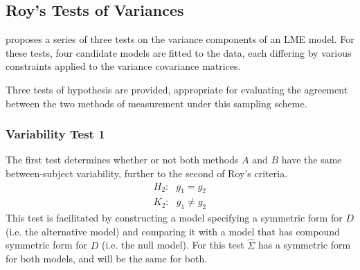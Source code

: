 \documentclass[12pt, a4paper]{report}
\theoremstyle{plain}
\theoremstyle{definition}
\theoremstyle{remark}
\begin{document}
	
	
	
	
	\subsection{Roy's Tests of Variances}
	
	
	
	
	\citet{ARoy2009} proposes a series of three tests on the variance components of an LME model. For these tests, four candidate models are fitted to the data, each differing by various constraints applied to the variance covariance matrices. 
	
	
	
	
	Three tests of hypothesis are provided, appropriate for evaluating the agreement between the two methods of measurement under this sampling scheme. 
	
	\subsubsection{Variability Test 1}
	The first test determines whether or not both methods $A$ and $B$ have the same between-subject variability, further to the second of Roy's criteria.
	\begin{eqnarray*}
		H_{2}: \mbox{ }g_{1}  = g_{2} \\
		K_{2}: \mbox{ }g_{1}  \neq g_{2}
	\end{eqnarray*}
	This test is facilitated by constructing a model specifying a symmetric form for $D$ (i.e. the alternative model) and comparing it with a model that has compound symmetric form for $D$ (i.e. the null model). For this test ${\hat{\Sigma}}$ has a symmetric form for both models, and will be the same for both.
	
\end{document}
